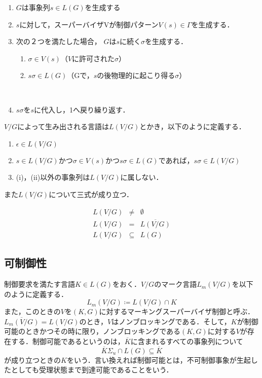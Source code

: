 \documentclass[dvipdfmx]{newthesis}
\begin{document}
\begin{enumerate}
    \item $G$は事象列$s \in L(G)$を生成する
    \item $s$に対して，スーパーバイザVが制御パターン$V(s) \in \Gamma$を生成する．
    \item 次の２つを満たした場合， $G$は$s$に続く$\sigma$を生成する．
    \begin{enumerate}
        \renewcommand{\theenumii}{\roman{enumii}}
        \item $\sigma \in V(s)$（$V$に許可された$\sigma$）
        \item $s\sigma \in L(G)$（Gで，$s$の後物理的に起こり得る$\sigma$）
        \end{enumerate}
　　\item $s\sigma$を$s$に代入し，1へ戻り繰り返す．
\end{enumerate}

$V/G$によって生み出される言語は$L(V/G)$とかき，以下のように定義する．
\begin{enumerate}
    \renewcommand{\theenumi}{(\roman{enumi})}
    \item $\epsilon \in L(V/G)$
    \item $s \in L(V/G)$かつ$\sigma \in V(s)$かつ$s\sigma \in L(G)$であれば，$s\sigma  \in L(V/G)$
    \item (i)，(ii)以外の事象列は$L(V/G)$に属しない．
\end{enumerate}

また$L(V/G)$について三式が成り立つ．

\begin{eqnarray}
    L(V/G)&\neq&\emptyset\\L(V/G)&=&\overline{L(V/G)}\\L(V/G)&\subseteq&L(G)
\end{eqnarray}

\subsection{可制御性}

制御要求を満たす言語$K \in L(G)$をおく．$V/G$のマーク言語$L_m(V/G)$を以下のように定義する．
$$L_m(V/G) \coloneqq L(V/G) \cap K$$
また，このときの$V$を$(K, G)$に対するマーキングスーパーバイザ制御と呼ぶ．
$\overline{L_m(V/G)} = L(V/G)$のとき，$V$はノンブロッキングである．そして，$K$が制御可能のときかつその時に限り，ノンブロッキングである$(K,G)$に対する$V$が存在する．制御可能であるというのは，$\overline{K}$に含まれるすべての事象列について
\begin{equation}
    \overline{K}\Sigma_u\cap L(G)\subseteq\overline{K}
\end{equation} 
が成り立つときの$K$をいう．言い換えれば制御可能とは，不可制御事象が生起したとしても受理状態まで到達可能であることをいう．%
\end{document}
